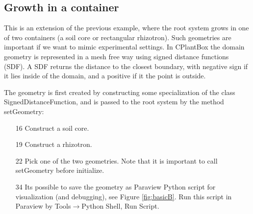 \subsection{Growth in a container}

This is an extension of the previous example, where the root system grows in one of two containers (a soil core or rectangular rhizotron). Such geometries are important if we want to mimic experimental settings. In CPlantBox the domain geometry is represented in a mesh free way using signed distance functions (SDF). A SDF returns the distance to the closest boundary, with negative sign if it lies inside of the domain, and a positive if it the point is outside.



The geometry is first created by constructing some specialization of the class SignedDistanceFunction, and is passed to the root system by the method setGeometry: 
\begin{itemize}
 \item[16] Construct a soil core. 
 \item[19] Construct a rhizotron.
 \item[22] Pick one of the two geometries. Note that it is important to call setGeometry before initialize.
 \item[34] Its possible to save the geometry as Paraview Python script for visualization (and debugging), see Figure \ref{fig:basicB}. Run this script in Paraview by Tools$\rightarrow$Python Shell, Run Script.
\end{itemize}

